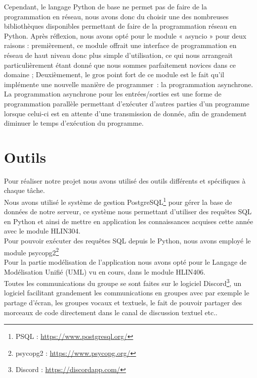 \documentclass{report}
\begin{document}
Cependant, le langage Python de base ne permet pas de faire de la programmation en réseau, nous avons donc du choisir une des nombreuses bibliothèques disponibles permettant de faire de la programmation réseau en Python. Après réflexion, nous avons opté pour le module « asyncio » pour deux raisons : premièrement, ce module offrait une interface de programmation en réseau de haut niveau donc plus simple d'utilisation, ce qui nous arrangeait particulièrement étant donné que nous sommes parfaitement novices dans ce domaine ; Deuxièmement, le gros point fort de ce module est le fait qu'il implémente une nouvelle manière de programmer~: la programmation asynchrone. La programmation asynchrone pour les entrées/sorties est une forme de programmation parallèle permettant d'exécuter d'autres parties d'un programme lorsque celui-ci est en attente d'une transmission de donnée, afin de grandement diminuer le temps d'exécution du programme. \\

\section{Outils} %
Pour réaliser notre projet nous avons utilisé des outils différents et spécifiques à chaque tâche. \\

Nous avons utilisé le système de gestion PostgreSQL\footnote{PSQL : \url{https://www.postgresql.org/}} pour gérer la base de données de notre serveur, ce système nous permettant d'utiliser des requêtes SQL en Python et ainsi de mettre en application les connaissances acquises cette année avec le module HLIN304. \\
Pour pouvoir exécuter des requêtes SQL depuis le Python, nous avons employé le module psycopg2\footnote{psycopg2 : \url{https://www.psycopg.org/}} \\

Pour la partie modélisation de l'application nous avons opté pour le Langage de Modélisation Unifié (UML) vu en cours, dans le module HLIN406. \\

Toutes les communications du groupe se sont faites sur le logiciel Discord\footnote{Discord : \url{https://discordapp.com/}}, un logiciel facilitant grandement les communications en groupes avec par exemple le partage d'écran, les groupes vocaux et textuels, le fait de pouvoir partager des morceaux de code directement dans le canal de discussion textuel etc.. \\
\end{document}
